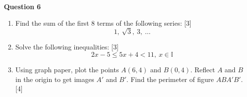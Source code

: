 \newpage
\noindent
\textbf{Question 6}
\begin{enumerate}[label=(\roman*)]

    \item Find the sum of the first 8 terms of the following series: \hfill [3]
        \[
            1,\ \sqrt3,\ 3,\ \dots
        \]

    \item Solve the following inequalities: \hfill [3]
        \[
            2x-5 \leq 5x+4 < 11, \ x \in \mathbb{I}
        \]

    \item Using graph paper, plot the points $A(6,4)$ and $B(0,4)$. 
        Reflect $A$ and $B$ in the origin to get images $A'$ and $B'$. 
        Find the perimeter of figure $ABA'B'$. \hfill [4]

\end{enumerate}

